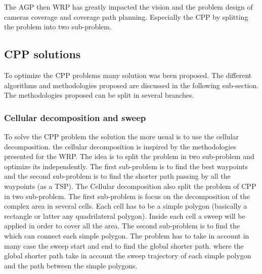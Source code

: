 The AGP then WRP has greatly impacted the vision and the problem design of cameras coverage and coverage path planning. Especially the CPP by splitting the problem into two sub-problem. 



 


%
%
%

\subsection{CPP solutions}

To optimize the CPP problems many solution was been proposed. The different algorithms and methodologies proposed are discussed in the following sub-section. The methodologies proposed  can be split in several branches.
%
%

\subsubsection{ Cellular decomposition and sweep}
To solve the CPP problem the solution the more usual is to use the cellular decomposition. the cellular decomposition is inspired by the methodologies presented for the WRP.
The idea is to split the problem in two sub-problem and optimize its independently. The first sub-problem is to find the best waypoints and the second sub-problem is to find the shorter path passing by all the waypoints (as a TSP).
 The Cellular decomposition also split the problem of CPP in two sub-problem.  The first sub-problem is focus on the decomposition of the complex area in several cells.  Each cell has to be a simple polygon (basically a rectangle or latter any quadrilateral polygon). Inside each cell a sweep will be applied in order to cover all the area. The second sub-problem is to find the which can connect each simple polygon. The problem has to take in account in  many case the sweep start and end to find the global shorter path. where the global shorter path  take in account the sweep trajectory of each simple polygon and the path between the  simple polygons.
 
